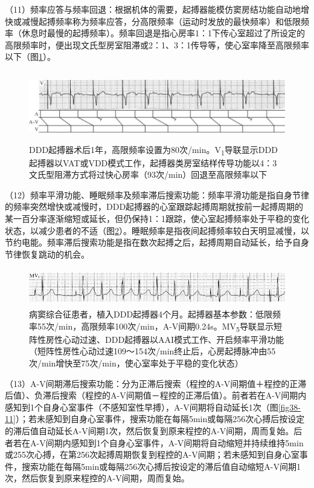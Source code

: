 （11）频率应答与频率回退：根据机体的需要，起搏器能模仿窦房结功能自动地增快或减慢起搏频率称为频率应答，分高限频率（运动时发放的最快频率）和低限频率（休息时最慢的起搏频率）。频率回退是指心房率1：1下传心室超过了所设定的高限频率时，便出现文氏型房室阻滞或2：1、3：1传导等，使心室率降至高限频率以下（图\ref{fig38-9}）。

\begin{figure}[!htbp]
 \centering
 \includegraphics[width=5.82292in,height=1.19792in]{./images/Image00612.jpg}
 \captionsetup{justification=centering}
 \caption{DDD起搏器术后1年，高限频率设置为80次/min。V\textsubscript{1}导联显示DDD起搏器以VAT或VDD模式工作，起搏器类房室结样传导功能以4：3文氏型阻滞方式将过快心房率（93次/min）回退至高限频率以下}
 \label{fig38-9}
  \end{figure} 


（12）频率平滑功能、睡眠频率及频率滞后搜索功能：频率平滑功能是指自身节律的频率突然增快或减慢时，DDD起搏器的心室跟踪起搏周期就按前一起搏周期的某一百分率逐渐缩短或延长，但仍保持1：1跟踪，使心室起搏频率处于平稳的变化状态，以减少患者的不适（图\ref{fig38-10}）。睡眠频率是指夜间起搏频率较白天明显减慢，以节约电能。频率滞后搜索功能是指在数次起搏之后，起搏周期自动延长，给予自身节律恢复跳动的机会。

\begin{figure}[!htbp]
 \centering
 \includegraphics[width=5.58333in,height=0.63542in]{./images/Image00613.jpg}
 \captionsetup{justification=centering}
 \caption{病窦综合征患者，植入DDD起搏器4个月。起搏器基本参数：低限频率55次/min，高限频率100次/min，A-V间期0.24s。MV\textsubscript{5}导联显示短阵性房性心动过速、DDD起搏器以AAI模式工作、开启频率平滑功能（短阵性房性心动过速109～154次/min终止后，心房起搏脉冲由55次/min增快至75次/min，使心室率处于平稳的变化状态）}
 \label{fig38-10}
  \end{figure} 


（13）A-V间期滞后搜索功能：分为正滞后搜索（程控的A-V间期值＋程控的正滞后值）、负滞后搜索（程控的A-V间期值－程控的正滞后值）。前者若在A-V间期内感知到1个自身心室事件（不感知室性早搏），A-V间期将自动延长1次（图\ref{fig38-11}）；若未感知到自身心室事件，搜索功能在每隔5min或每隔256次心搏后按设定的滞后值自动延长A-V间期1次，然后恢复到原来程控的A-V间期，周而复始。后者若在A-V间期内感知到1个自身心室事件，A-V间期将自动缩短并持续维持5min或255次心搏，在第256次起搏周期恢复到程控的A-V间期；若未感知到自身心室事件，搜索功能在每隔5min或每隔256次心搏后按设定的滞后值自动缩短A-V间期1次，然后恢复到原来程控的A-V间期，周而复始。

